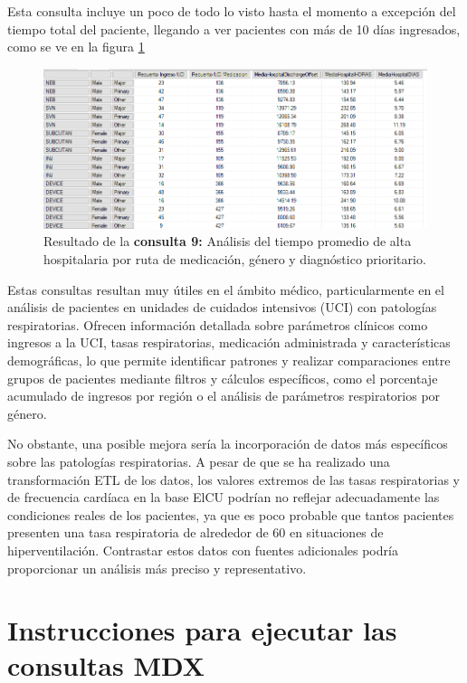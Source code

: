 \documentclass[12pt, a4paper, twoside]{article}
\begin{document}
Esta consulta incluye un poco de todo lo visto hasta el momento a excepción del tiempo total del paciente, llegando a ver pacientes con más de 10 días ingresados, como se ve en la figura \ref{fig:consulta9}
\begin{figure}[H]
	\centering
	\includegraphics[width=1\textwidth]{image/consulta9.png}
	\caption{Resultado de la \textbf{consulta 9:} Análisis del tiempo promedio de alta hospitalaria por ruta de medicación, género y diagnóstico prioritario.}
	\label{fig:consulta9}
\end{figure}

Estas consultas resultan muy útiles en el ámbito médico, particularmente en el análisis de pacientes en unidades de cuidados intensivos (UCI) con patologías respiratorias. Ofrecen información detallada sobre parámetros clínicos como ingresos a la UCI, tasas respiratorias, medicación administrada y características demográficas, lo que permite identificar patrones y realizar comparaciones entre grupos de pacientes mediante filtros y cálculos específicos, como el porcentaje acumulado de ingresos por región o el análisis de parámetros respiratorios por género.

No obstante, una posible mejora sería la incorporación de datos más específicos sobre las patologías respiratorias. A pesar de que se ha realizado una transformación ETL de los datos, los valores extremos de las tasas respiratorias y de frecuencia cardíaca en la base ElCU podrían no reflejar adecuadamente las condiciones reales de los pacientes, ya que es poco probable que tantos pacientes presenten una tasa respiratoria de alrededor de 60 en situaciones de hiperventilación. Contrastar estos datos con fuentes adicionales podría proporcionar un análisis más preciso y representativo.
	
	
	\section{Instrucciones para ejecutar las consultas MDX}
	
\end{document}
